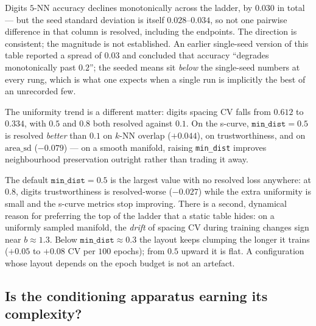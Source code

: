 \documentclass[12pt]{iopart}
\theoremstyle{definition}
\theoremstyle{plain}
\theoremstyle{remark}
\newcommand{\code}[1]{\texttt{#1}}
\begin{document}
Digits $5$-NN accuracy declines monotonically across the ladder, by $0.030$ in
total --- but the seed standard deviation is itself $0.028$--$0.034$, so not one
pairwise difference in that column is resolved, including the endpoints. The
direction is consistent; the magnitude is not established. An earlier
single-seed version of this table reported a spread of $0.03$ and concluded that
accuracy ``degrades monotonically past $0.2$''; the seeded means sit
\emph{below} the single-seed numbers at every rung, which is what one expects
when a single run is implicitly the best of an unrecorded few.

The uniformity trend is a different matter: digits spacing CV falls from
$0.612$ to $0.334$, with $0.5$ and $0.8$ both resolved against $0.1$. On the
s-curve, $\code{min\_dist}=0.5$ is resolved \emph{better} than $0.1$ on $k$-NN
overlap ($+0.044$), on trustworthiness, and on $\mathrm{area\_sd}$ ($-0.079$) ---
on a smooth manifold, raising \code{min\_dist} improves neighbourhood
preservation outright rather than trading it away.

The default $\code{min\_dist}=0.5$ is the largest value with no resolved loss
anywhere: at $0.8$, digits trustworthiness is resolved-worse ($-0.027$) while
the extra uniformity is small and the s-curve metrics stop improving. There is a
second, dynamical reason for preferring the top of the ladder that a static
table hides: on a uniformly sampled manifold, the \emph{drift} of spacing CV
during training changes sign near $b\approx1.3$. Below $\code{min\_dist}\approx
0.3$ the layout keeps clumping the longer it trains ($+0.05$ to $+0.08$ CV per
$100$ epochs); from $0.5$ upward it is flat. A configuration whose layout
depends on the epoch budget is not an artefact.

\subsection{Is the conditioning apparatus earning its complexity?}
\label{sec:filmvsconcat}
\end{document}
